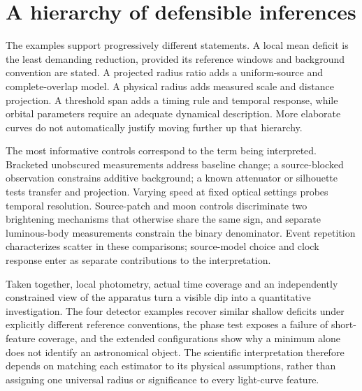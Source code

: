 \section{A hierarchy of defensible inferences}
The examples support progressively different statements. A local mean deficit is the least demanding reduction, provided its reference windows and background convention are stated. A projected radius ratio adds a uniform-source and complete-overlap model. A physical radius adds measured scale and distance projection. A threshold span adds a timing rule and temporal response, while orbital parameters require an adequate dynamical description. More elaborate curves do not automatically justify moving further up that hierarchy.

The most informative controls correspond to the term being interpreted. Bracketed unobscured measurements address baseline change; a source-blocked observation constrains additive background; a known attenuator or silhouette tests transfer and projection. Varying speed at fixed optical settings probes temporal resolution. Source-patch and moon controls discriminate two brightening mechanisms that otherwise share the same sign, and separate luminous-body measurements constrain the binary denominator. Event repetition characterizes scatter in these comparisons; source-model choice and clock response enter as separate contributions to the interpretation.

Taken together, local photometry, actual time coverage and an independently constrained view of the apparatus turn a visible dip into a quantitative investigation. The four detector examples recover similar shallow deficits under explicitly different reference conventions, the phase test exposes a failure of short-feature coverage, and the extended configurations show why a minimum alone does not identify an astronomical object. The scientific interpretation therefore depends on matching each estimator to its physical assumptions, rather than assigning one universal radius or significance to every light-curve feature.
